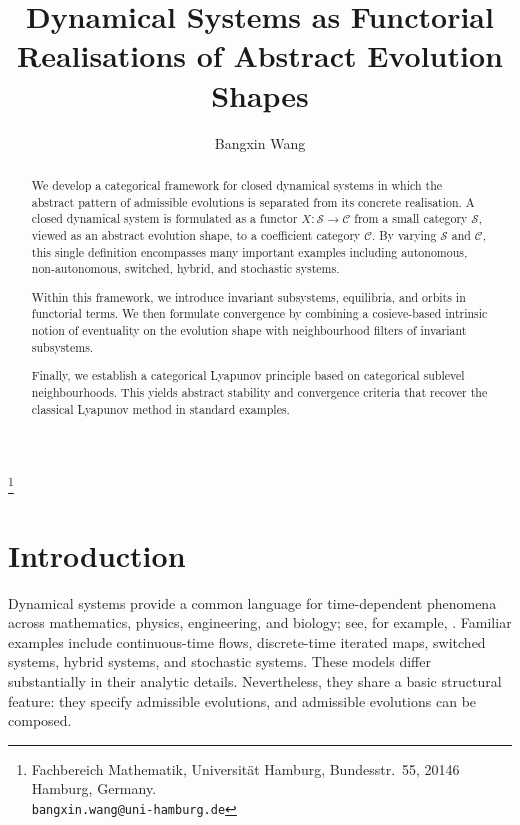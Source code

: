 \documentclass[a4paper,reqno,oneside]{amsart}
\theoremstyle{definition}
\theoremstyle{remark}
\numberwithin{equation}{section}
\begin{document}
	\title{Dynamical Systems as Functorial Realisations of Abstract Evolution Shapes}
	
	
	
	\author[B.~Wang]{Bangxin Wang}
	
	\thanks{Fachbereich Mathematik, Universit\"at Hamburg, Bundesstr.\ 55,
    20146 Hamburg, Germany.\\
	\texttt{bangxin.wang@uni-hamburg.de}}
	


    
\begin{abstract}
We develop a categorical framework for closed dynamical systems in which the
abstract pattern of admissible evolutions is separated from its concrete
realisation. A closed dynamical system is formulated as a functor
$X\colon \mathcal S\to\mathcal C$ from a small category $\mathcal S$,
viewed as an abstract evolution shape, to a coefficient category
$\mathcal C$. By varying $\mathcal S$ and $\mathcal C$, this single
definition encompasses many important examples including autonomous, non-autonomous, switched, hybrid, and
stochastic systems.

Within this framework, we introduce invariant subsystems, equilibria, and orbits in functorial terms. We then formulate convergence by combining a cosieve-based intrinsic notion of eventuality on the evolution shape with neighbourhood filters of invariant subsystems.

Finally, we establish a categorical Lyapunov principle based on categorical sublevel neighbourhoods. This yields abstract stability and convergence criteria that recover the classical Lyapunov method in standard examples.
\end{abstract}
	
	\maketitle
	\setcounter{tocdepth}{2}
	{\small
		\vspace*{-3em}
		\tableofcontents
	}


    \clearpage

    \section{Introduction}

Dynamical systems provide a common language for time-dependent phenomena
across mathematics, physics, engineering, and biology; see, for example,
\cite{BS02,HSD13,St18,Kh02}. Familiar examples include continuous-time
flows, discrete-time iterated maps, switched systems,
hybrid systems, and stochastic systems. These models differ substantially in
their analytic details. Nevertheless, they share a basic structural feature: they specify admissible evolutions, and admissible evolutions can be composed.
\end{document}
